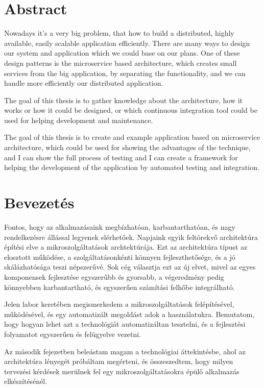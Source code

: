 \documentclass[11pt,magyar,a4paper,twoside,]{report}
\begin{document}
\chapter*{Abstract}\label{abstract}

Nowadays it's a very big problem, that how to build a distributed,
highly available, easily scalable application efficiently. There are
many ways to design our system and application which we could base on
our plans. One of these design patterns is the microservice based
architecture, which creates small services from the big application, by
separating the functionality, and we can handle more efficiently our
distributed application.

The goal of this thesis is to gather knowledge about the architecture,
how it works or how it could be designed, or which continuous
integration tool could be used for helping development and maintenance.

The goal of this thesis is to create and example application based on
microservice architecture, which could be used for showing the
advantages of the technique, and I can show the full process of testing
and I can create a framework for helping the development of the
application by automated testing and integration.

\chapter{Bevezetés}\label{bevezetuxe9s}

Fontos, hogy az alkalmazásaink megbízhatóan, karbantarthatóan, és nagy
rendelkezésre állással legyenek elérhetőek. Napjaink egyik feltörekvő
architektúra építési elve a mikroszolgáltatások archtektúrája. Ezt az
architektúra típust az elosztott működése, a szolgáltatásonkénti könnyen
fejleszthetősége, és a jó skálázhatósága teszi népszerűvé. Sok cég
választja ezt az új elvet, mivel az egyes komponensek fejlesztése
egyszerűbb és gyorsabb, a végeredmény pedig könnyebben karbantartható,
és egyszerűen számítási felhőbe integrálható.

Jelen labor keretében megismerkedem a mikroszolgáltatások felépítésével,
működésével, és egy automatizált megoldást adok a használatukra.
Bemutatom, hogy hogyan lehet azt a technológiát automatizáltan
tesztelni, és a fejlesztési folyamatot egyszerűen és felügyelve vezetni.

Az második fejezetben beleástam magam a technológiai áttekintésbe, ahol
az architektúra lényegét próbáltam megérteni, és összeszedtem, hogy
milyen tervezési kérdések merülnek fel egy mikroszolgáltatásokra épülő
alkalmazás elkészítésénél.
\end{document}
